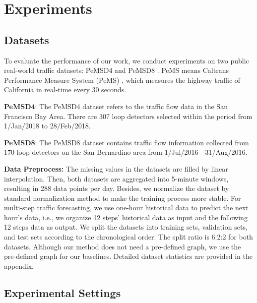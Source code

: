 \documentclass{article}
\begin{document}
\section{Experiments}
\subsection{Datasets}
To evaluate the performance of our work, we conduct experiments on two public real-world traffic datasets: PeMSD4 and PeMSD8 \cite{astgcn,stsgcn-aaai2020}. PeMS means Caltrans Performance Measure System (PeMS) \cite{pems}, which measures the highway traffic of California in real-time every 30 seconds.

\textbf{PeMSD4}: The PeMSD4 dataset refers to the traffic flow data in the San Francisco Bay Area. There are 307 loop detectors selected within the period from 1/Jan/2018 to 28/Feb/2018. 

\textbf{PeMSD8}: The PeMSD8 dataset contains traffic flow information collected from 170 loop detectors on the San Bernardino area from 1/Jul/2016 - 31/Aug/2016. 

\textbf{Data Preprocess:} The missing values in the datasets are filled by linear interpolation. Then, both datasets are aggregated into 5-minute windows, resulting in 288 data points per day. Besides, we normalize the dataset by standard normalization method to make the training process more stable. For multi-step traffic forecasting, we use one-hour historical data to predict the next hour's data, i.e., we organize 12 steps' historical data as input and the following 12 steps data as output. We split the datasets into training sets, validation sets, and test sets according to the chronological order. The split ratio is 6:2:2 for both datasets.
Although our method does not need a pre-defined graph, we use the pre-defined graph for our baselines. Detailed dataset statistics are provided in the appendix.

\subsection{Experimental Settings}
 
\end{document}
